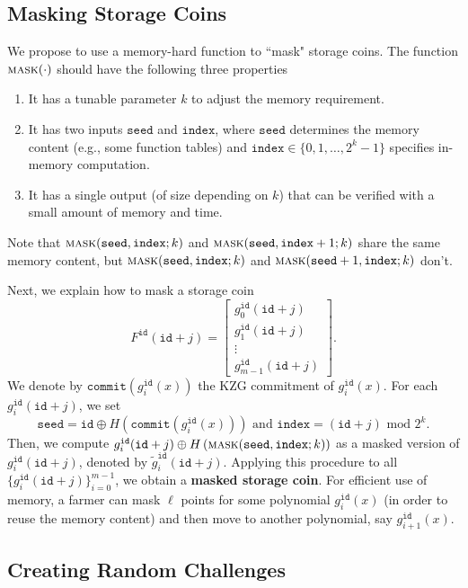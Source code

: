 \documentclass[12pt,draftcls,onecolumn]{IEEEtran}
\newcommand{\id}{\texttt{id}}
\newcommand{\seed}{\texttt{seed}}
\newcommand{\ind}{\texttt{index}}
\newcommand{\cmt}{\texttt{commit}}
\newcommand{\mask}{\textsc{mask}}
\begin{document}
\subsection{Masking Storage Coins}

We propose to use a memory-hard function to ``mask" storage coins. The function $\mask(\cdot)$ should have the following three properties

\begin{enumerate}
    \item It has a tunable parameter $k$ to adjust the memory requirement. 
    \item It has two inputs $\seed$ and $\ind$, where $\seed$ determines the memory content (e.g., some function tables)
    and $\ind \in \{0, 1, \ldots, 2^k - 1 \}$ specifies in-memory computation.
    \item It has a single output (of size depending on $k$) that can be verified with a small amount of memory and time.
\end{enumerate}


Note that $\mask(\seed, \ind; k)$ and $\mask(\seed, \ind + 1; k)$ share the same memory content, but $\mask(\seed, \ind; k)$
and $\mask(\seed + 1, \ind; k)$ don't. 

Next, we explain how to mask a storage coin
\[
F^{\id}(\id + j) = \begin{bmatrix} g_0^{\id}(\id + j)\\ g_1^{\id}(\id + j)\\  \vdots \\ g_{m-1}^{\id}(\id + j) \end{bmatrix}.
\]
We denote by $\cmt\left(g_i^{\id}(x)\right)$ the KZG commitment of $g_i^{\id}(x)$.
For each $g_i^{\id}(\id + j)$, we set
\[
\seed = \id \oplus H\left( \cmt\left(g_i^{\id}(x)\right) \right) \mbox{ and } \ind = (\id + j) \mbox{ mod } 2^k.
\]
Then, we compute $g_i^{\id}(\id + j) \oplus H\left( \mask(\seed, \ind; k) \right)$ as a masked version of $g_i^{\id}(\id + j)$, denoted by $\tilde{g}_i^{\id}(\id + j)$.
Applying this procedure to all $\{ g_i^{\id}(\id + j) \}_{i = 0}^{m - 1}$, we obtain a {\bf masked storage coin}.
For efficient use of memory, a farmer can mask $\ell$ points for some polynomial $g_i^{\id}(x)$ (in order to reuse the memory content) and then move to another polynomial, say $g_{i+1}^{\id}(x)$.

\subsection{Creating Random Challenges}
\end{document}
